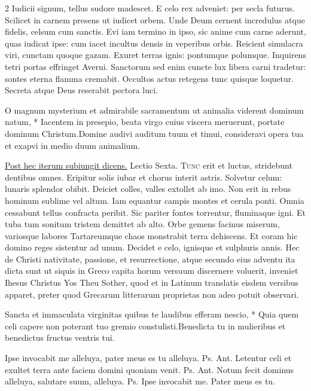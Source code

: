 \begin{multicols*}{2}
Iudicii signum, tellus sudore madescet.
E celo rex adveniet: per secla futurus.
Scilicet in carnem presens ut iudicet orbem.
Unde Deum cernent incredulus atque fidelis, celsum cum sanctis.
Evi iam termino in ipso, sic anime cum carne aderunt, quas iudicat ipse: cum iacet incultus densis in veperibus orbis.
Reicient simulacra viri, cunctam quoque gazam.
Exuret terras ignis: pontumque polumque.
Inquirens tetri portas effringet Averni.
Sanctorum sed enim cuncte lux libera carni tradetur: sontes eterna flamma cremabit.
Occultos actus retegens tunc quisque loquetur.
Secreta atque Deus reserabit pectora luci.
\begin{responsory}
{O magnum mysterium et admirabile sacramentum ut animalia viderent dominum natum, * Iacentem in presepio, beata virgo cuius viscera meruerunt, portate dominum Christum.}{Domine audivi auditum tuum et timui, consideravi opera tua et exapvi in medio duum animalium.}%
\end{responsory}%
\newline \ul{Post hec iterum subiungit dicens.}
{\color{Red} Lectio Sexta.}
\lettrine[lines=2]{\zallmancaps \color{Blue} T}{unc} erit et luctus, stridebunt dentibus omnes.
Eripitur solis iubar et chorus interit astris.
Solvetur celum: lunaris splendor obibit.
Deiciet colles, valles extollet ab imo.
Non erit in rebus hominum sublime vel altum.
Iam equantur campis montes et cerula ponti.
Omnia cessabunt tellus confracta peribit.
Sic pariter fontes torrentur, fluminaque igni.
Et tuba tum sonitum tristem demittet ab alto.
Orbe gemens facinus miserum, variosque labores Tartareumque chaos monstrabit terra dehiscens.
Et coram hic domino reges sistentur ad unum.
Decidet e celo, ignisque et sulphuris annis. %
Hec de Christi nativitate, passione, et resurrectione, atque secundo eius adventu ita dicta sunt ut siquis in Greco capita horum versuum discernere voluerit, inveniet Ihesus Christus Yos Theu Sother, quod et in Latinum translatis eisdem versibus apparet, preter quod Grecarum litterarum proprietas non adeo potuit observari.
\begin{responsory-doxology}
{Sancta et immaculata virginitas quibus te laudibus efferam nescio, * Quia quem celi capere non poterant tuo gremio constulisti.}{Benedicta tu in mulieribus et benedictus fructus ventris tui.}
\end{responsory-doxology}%
 Ipse invocabit me alleluya, pater meus es tu alleluya. {\color{Red} Ps.}  {\color{Red} Ant.} Letentur celi et exultet terra ante faciem domini quoniam venit. {\color{Red} Ps.}  {\color{Red} Ant.} Notum fecit dominus alleluya, salutare suum, alleluya. {\color{Red} Ps.}  \V Ipse invocabit me. \R Pater meus es tu.

\end{multicols*}
